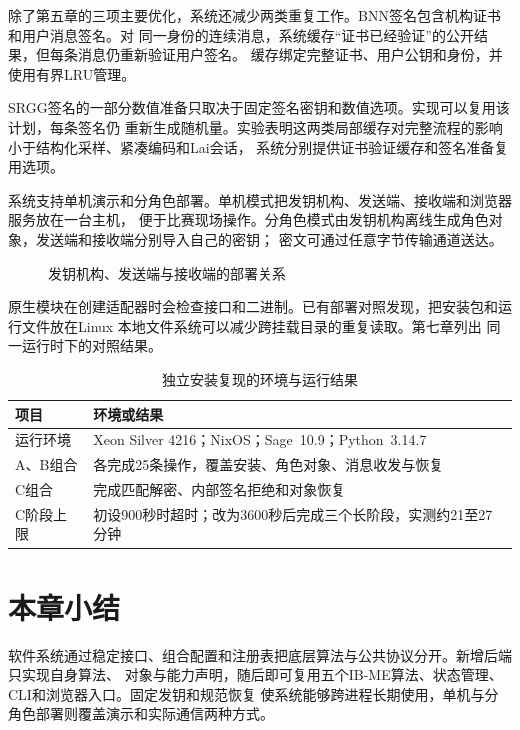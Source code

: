 除了第五章的三项主要优化，系统还减少两类重复工作。BNN签名包含机构证书和用户消息签名。对
同一身份的连续消息，系统缓存“证书已经验证”的公开结果，但每条消息仍重新验证用户签名。
缓存绑定完整证书、用户公钥和身份，并使用有界LRU管理。

SRGG签名的一部分数值准备只取决于固定签名密钥和数值选项。实现可以复用该计划，每条签名仍
重新生成随机量。实验表明这两类局部缓存对完整流程的影响小于结构化采样、紧凑编码和Lai会话，
系统分别提供证书验证缓存和签名准备复用选项。

系统支持单机演示和分角色部署。单机模式把发钥机构、发送端、接收端和浏览器服务放在一台主机，
便于比赛现场操作。分角色模式由发钥机构离线生成角色对象，发送端和接收端分别导入自己的密钥；
密文可通过任意字节传输通道送达。

\begin{figure}[H]
\centering
{}
\caption{发钥机构、发送端与接收端的部署关系}
\label{fig:deployment}
\end{figure}

原生模块在创建适配器时会检查接口和二进制。已有部署对照发现，把安装包和运行文件放在Linux
本地文件系统可以减少跨挂载目录的重复读取。第七章列出
同一运行时下的对照结果。

\begin{table}[H]
\centering\small
\caption{独立安装复现的环境与运行结果}
\label{tab:installation-reproduction}
\begin{tabularx}{\textwidth}{@{}p{}X@{}}
\toprule
\rowcolor{black!8} 项目 & 环境或结果 \\
\midrule
运行环境 & Xeon Silver 4216；NixOS；Sage~10.9；Python~3.14.7 \\
A、B组合 & 各完成25条操作，覆盖安装、角色对象、消息收发与恢复 \\
C组合 & 完成匹配解密、内部签名拒绝和对象恢复 \\
C阶段上限 & 初设900秒时超时；改为3600秒后完成三个长阶段，实测约21至27分钟 \\
\bottomrule
\end{tabularx}
\end{table}

\section{本章小结}

软件系统通过稳定接口、组合配置和注册表把底层算法与公共协议分开。新增后端只实现自身算法、
对象与能力声明，随后即可复用五个IB-ME算法、状态管理、CLI和浏览器入口。固定发钥和规范恢复
使系统能够跨进程长期使用，单机与分角色部署则覆盖演示和实际通信两种方式。
